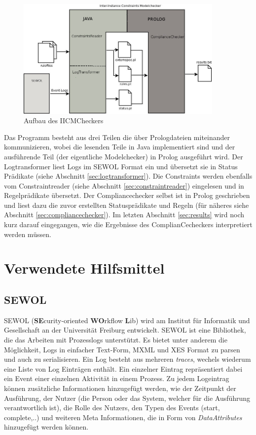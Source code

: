 \begin{figure}[ht]
	\centering
  \includegraphics[width=0.9\textwidth]{Figures/Programm}
	\caption{Aufbau des IICMCheckers}
	\label{fig:myprog}
\end{figure}
Das Programm besteht aus drei Teilen die über Prologdateien miteinander kommunizieren, wobei die lesenden Teile in Java implementiert sind und der ausführende Teil (der eigentliche Modelchecker) in Prolog ausgeführt wird.
Der Logtransformer liest Logs im SEWOL \cite{SEWOL} Format ein und übersetzt sie in Status Prädikate (siehe Abschnitt \ref{sec:logtransformer}). 
Die Constraints werden ebenfalls vom Constraintreader (siehe Abschnitt \ref{sec:constraintreader}) eingelesen und in Regelprädikate übersetzt.
Der Compliancechecker selbst ist in Prolog geschrieben und liest dazu die zuvor erstellten Statusprädikate und Regeln (für näheres siehe Abschnitt \ref{sec:compliancechecker}). Im letzten Abschnitt \ref{sec:results} wird noch kurz darauf eingegangen, wie die Ergebnisse des ComplianCecheckers interpretiert werden müssen.

\section{Verwendete Hilfsmittel}
\subsection{SEWOL}
SEWOL (\textbf{SE}curity-oriented \textbf{WO}rkflow \textbf{L}ib) wird am Institut für Informatik und Gesellschaft an der Universität Freiburg entwickelt. SEWOL ist eine Bibliothek, die das Arbeiten mit Prozesslogs unterstützt. Es bietet unter anderem die Möglichkeit, Logs in einfacher Text-Form, MXML und XES Format zu parsen und auch zu serialisieren. Ein Log besteht aus mehreren \textit{traces}, wechels wiederum eine Liste von Log Einträgen enthält. Ein einzelner Eintrag repräsentiert dabei ein Event einer einzelnen Aktivität in einem Prozess. Zu jedem Logeintrag können zusätzliche Informationen hinzugefügt werden, wie der Zeitpunkt der Ausführung, der Nutzer (die Person oder das System, welcher für die Ausführung verantwortlich ist), die Rolle des Nutzers, den Typen des Events (start, complete,..) und weiteren Meta Informationen, die in Form von \textit{DataAttributes} hinzugefügt werden können. \cite{SEWOL}

